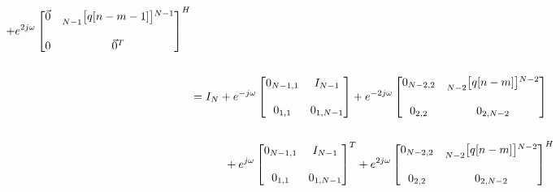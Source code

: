 \documentclass{article}
\begin{document}
\begin{align*}
                      + e^{2j\omega}\begin{bmatrix}
                                           \vec{0} & \prescript{}{N - 1}{\begin{bmatrix} q[n - m - 1] \end{bmatrix}}^{N - 1} \\ \\
                                                0  & \vec{0}^{T}
                                      \end{bmatrix}^{H} \\ \\
    &= I_{N} + e^{-j\omega}\begin{bmatrix}
                                0_{N - 1, 1} & I_{N - 1} \\ \\
                                0_{    1, 1} & 0_{1, N - 1}
                             \end{bmatrix} +
              e^{-2j\omega}\begin{bmatrix}
                                0_{N - 2, 2} & \prescript{}{N - 2}{\begin{bmatrix} q[n - m] \end{bmatrix}}^{N - 2} \\ \\
                                0_{    2, 2} & 0_{2, N - 2}
                             \end{bmatrix} \\ \\
    &\quad \quad \quad + e^{j\omega}\begin{bmatrix}
                                           0_{N - 1, 1} & I_{N - 1} \\ \\
                                           0_{    1, 1} & 0_{1, N - 1}
                                      \end{bmatrix}^{T} 
                      + e^{2j\omega}\begin{bmatrix}
                                           0_{N - 2, 2} & \prescript{}{N - 2}{\begin{bmatrix} q[n - m] \end{bmatrix}}^{N - 2} \\ \\
                                           0_{    2, 2} & 0_{2, N - 2}
                                      \end{bmatrix}^{H} \\ \\

\end{align*}
\end{document}
